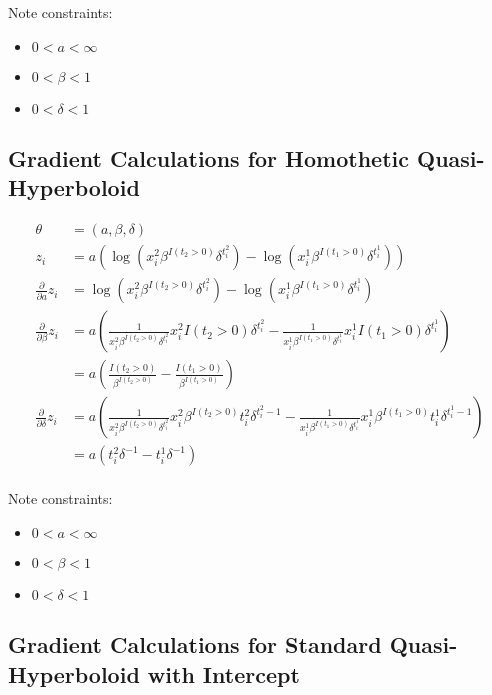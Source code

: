 \documentclass[12pt]{article}
\begin{document}
Note constraints:

\begin{itemize}
    \item{$0 < a < \infty$}
    \item{$0 < \beta < 1$}
    \item{$0 < \delta < 1$}
\end{itemize}

\subsection{Gradient Calculations for Homothetic Quasi-Hyperboloid}

\begin{align*}
\theta &= (a, \beta, \delta) \\
z_i &= a (
  \log(x^2_i \beta^{I(t_2 > 0)} \delta^{t^2_i})
  - \log(x^1_i \beta^{I(t_1 > 0)} \delta^{t^1_i})
) \\
\frac{\partial}{\partial a} z_i
  &= \log(x^2_i \beta^{I(t_2 > 0)} \delta^{t^2_i})
  - \log(x^1_i \beta^{I(t_1 > 0)} \delta^{t^1_i}) \\
\frac{\partial}{\partial \beta} z_i
  &= a (
    \frac{1}{x^2_i \beta^{I(t_2 > 0)} \delta^{t^2_i}} x^2_i I(t_2 > 0) \delta^{t^2_i}
    - \frac{1}{x^1_i \beta^{I(t_1 > 0)} \delta^{t^1_i}} x^1_i I(t_1 > 0) \delta^{t^1_i}
  ) \\
  &= a (
    \frac{I(t_2 > 0)}{\beta^{I(t_2 > 0)}}
    - \frac{I(t_1 > 0)}{\beta^{I(t_1 > 0)}}
  ) \\
\frac{\partial}{\partial \delta} z_i
  &= a (
    \frac{1}{x^2_i \beta^{I(t_2 > 0)} \delta^{t^2_i}} x^2_i \beta^{I(t_2 > 0)} t^2_i \delta^{t^2_i - 1}
    - \frac{1}{x^1_i \beta^{I(t_1 > 0)} \delta^{t^1_i}} x^1_i \beta^{I(t_1 > 0)} t^1_i \delta^{t^1_i - 1}
  ) \\
  &= a (
    t^2_i \delta^{-1}
    - t^1_i \delta^{-1}
  ) \\
\end{align*}

Note constraints:

\begin{itemize}
    \item{$0 < a < \infty$}
    \item{$0 < \beta < 1$}
    \item{$0 < \delta < 1$}
\end{itemize}

\subsection{Gradient Calculations for Standard Quasi-Hyperboloid with Intercept}
\end{document}
